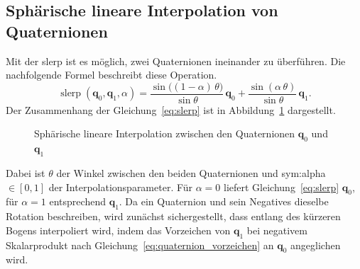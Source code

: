 \subsection{Sphärische lineare Interpolation von Quaternionen}
\label{sec:quaternionen_slerp}
Mit der \gls{slerp} ist es möglich, zwei Quaternionen ineinander zu überführen.
Die nachfolgende Formel beschreibt diese Operation.~\cite{Shoemake1985}
\begin{equation}
\operatorname{slerp}(\mathbf{q}_0, \mathbf{q}_1, \alpha) = \frac{\sin\!\bigl((1-\alpha)\,\theta\bigr)}{\sin\theta}\,\mathbf{q}_0 + \frac{\sin(\alpha\,\theta)}{\sin\theta}\,\mathbf{q}_1.
\label{eq:slerp}
\end{equation}
Der Zusammenhang der Gleichung~\ref{eq:slerp} ist in Abbildung~\ref{fig:slerp} dargestellt.
 \begin{figure}[htbp]
\centering
{}
\caption{Sphärische lineare Interpolation zwischen den Quaternionen $\mathbf{q}_0$ und $\mathbf{q}_1$~\cite{rohmer_slerp}}
\label{fig:slerp}
\end{figure}


Dabei ist \(\theta\) der Winkel zwischen den beiden Quaternionen und \gls{sym:alpha} $\in [0,1]$ der Interpolationsparameter.
Für $\alpha = 0$ liefert Gleichung~\ref{eq:slerp} $\mathbf{q}_0$, für $\alpha = 1$ entsprechend $\mathbf{q}_1$.
Da ein Quaternion und sein Negatives dieselbe Rotation beschreiben, wird zunächst sichergestellt, dass
entlang des kürzeren Bogens interpoliert wird, indem das Vorzeichen von $\mathbf{q}_1$ bei negativem
Skalarprodukt nach Gleichung~\ref{eq:quaternion_vorzeichen} an $\mathbf{q}_0$ angeglichen wird.~\cite{Shoemake1985}



